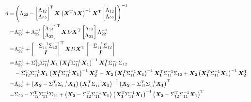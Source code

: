 \documentclass[twoside]{article}
\begin{document}
\begin{align*}
A
=&
 \left(
\Lambda_{22}
-
\begin{bmatrix} 
    \Lambda_{12} \\
    \Lambda_{22}
\end{bmatrix}^\mathrm{T}
\bm{X}
\left(\bm{X}^\mathrm{T}\Lambda\bm{X}\right)^{-1}
\bm{X}^\mathrm{T}
\begin{bmatrix} 
\Lambda_{12} \\
\Lambda_{22}
\end{bmatrix}
\right)^{-1}
\\
=&
\Lambda_{22}^{-1}
+
\Lambda_{22}^{-1}
\begin{bmatrix} 
    \Lambda_{12} \\
    \Lambda_{22}
\end{bmatrix}^\mathrm{T}
\bm{X}
D
\bm{X}^\mathrm{T}
\begin{bmatrix} 
    \Lambda_{12} \\
    \Lambda_{22}
\end{bmatrix}
\Lambda_{22}^{-1}
\\
=&
\Lambda_{22}^{-1}
+
\begin{bmatrix} 
    -\Sigma_{11}^{-1}\Sigma_{12} \\
    \bm{I}
\end{bmatrix}^\mathrm{T}
\bm{X}
D
\bm{X}^\mathrm{T}
\begin{bmatrix} 
    -\Sigma_{11}^{-1}\Sigma_{12} \\
    \bm{I}
\end{bmatrix}
\\
=&
\Lambda_{22}^{-1}
+
    \Sigma_{12}^\mathrm{T}\Sigma_{11}^{-1} 
\bm{X_1}
\left(\bm{X_1}^\mathrm{T}\Sigma_{11}^{-1}\bm{X_1}\right)^{-1}
\bm{X_1}^\mathrm{T}
    \Sigma_{11}^{-1}\Sigma_{12} 
\\
&-
    \Sigma_{12}^\mathrm{T}\Sigma_{11}^{-1} 
\bm{X_1}
\left(\bm{X_1}^\mathrm{T}\Sigma_{11}^{-1}\bm{X_1}\right)^{-1}
\bm{X_2}^\mathrm{T}
-
\bm{X_2}
\left(\bm{X_1}^\mathrm{T}\Sigma_{11}^{-1}\bm{X_1}\right)^{-1}
\bm{X_1}^\mathrm{T}
    \Sigma_{11}^{-1}\Sigma_{12} 
+
\bm{X_2}
\left(\bm{X_1}^\mathrm{T}\Sigma_{11}^{-1}\bm{X_1}\right)^{-1}
\bm{X_2}^\mathrm{T}
\\
=&
\Lambda_{22}^{-1}
+
    \left(\bm{X_2}-\Sigma_{12}^\mathrm{T}\Sigma_{11}^{-1} \bm{X_1}\right)
\left(\bm{X_1}^\mathrm{T}\Sigma_{11}^{-1}\bm{X_1}\right)^{-1}
    \left(\bm{X_2}-\Sigma_{12}^\mathrm{T}\Sigma_{11}^{-1} \bm{X_1}\right)^\mathrm{T}
\\
=&
\Sigma_{22} - \Sigma_{12}^\mathrm{T}\Sigma_{11}^{-1}\Sigma_{12}
+
    \left(\bm{X_2}-\Sigma_{12}^\mathrm{T}\Sigma_{11}^{-1} \bm{X_1}\right)
\left(\bm{X_1}^\mathrm{T}\Sigma_{11}^{-1}\bm{X_1}\right)^{-1}
    \left(\bm{X_2}-\Sigma_{12}^\mathrm{T}\Sigma_{11}^{-1} \bm{X_1}\right)^\mathrm{T}
\end{align*}
\end{document}

